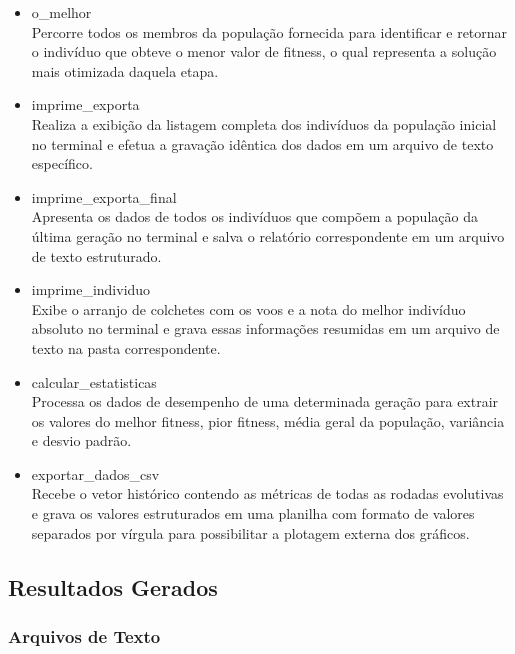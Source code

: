 \documentclass[conference]{IEEEtran}
\begin{document}
\begin{itemize}
	\item o\_melhor \\
	Percorre todos os membros da população fornecida para identificar e retornar o indivíduo que obteve o menor valor de fitness, o qual representa a solução mais otimizada daquela etapa.
	
	\item imprime\_exporta \\
	Realiza a exibição da listagem completa dos indivíduos da população inicial no terminal e efetua a gravação idêntica dos dados em um arquivo de texto específico.
	
	\item imprime\_exporta\_final \\
	Apresenta os dados de todos os indivíduos que compõem a população da última geração no terminal e salva o relatório correspondente em um arquivo de texto estruturado.
	
	\item imprime\_individuo \\
	Exibe o arranjo de colchetes com os voos e a nota do melhor indivíduo absoluto no terminal e grava essas informações resumidas em um arquivo de texto na pasta correspondente.
	
	\item calcular\_estatisticas\\
	Processa os dados de desempenho de uma determinada geração para extrair os valores do melhor fitness, pior fitness, média geral da população, variância e desvio padrão.
	
	\item exportar\_dados\_csv \\
	Recebe o vetor histórico contendo as métricas de todas as rodadas evolutivas e grava os valores estruturados em uma planilha com formato de valores separados por vírgula para possibilitar a plotagem externa dos gráficos.
\end{itemize}


\subsection{Resultados Gerados}

\subsubsection{Arquivos de Texto}
\end{document}

